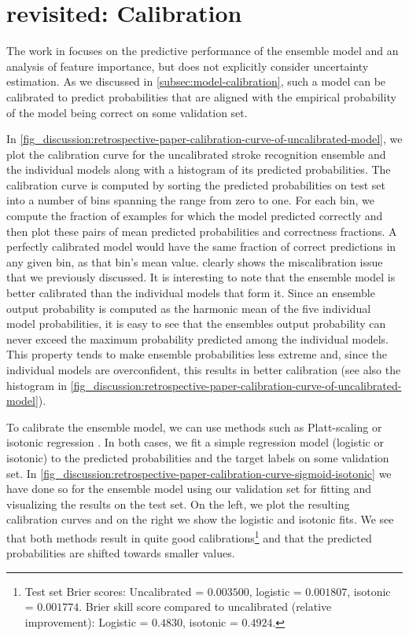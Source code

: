 \section{ revisited: Calibration}
The work in \textcite{wenstrup_retrospective_2023} focuses on the predictive performance of the ensemble model and an analysis of feature importance, but does not explicitly consider uncertainty estimation. 
As we discussed in \cref{subsec:model-calibration}, such a model can be calibrated to predict probabilities that are aligned with the empirical probability of the model being correct on some validation set.

In \cref{fig_discussion:retrospective-paper-calibration-curve-of-uncalibrated-model}, we plot the calibration curve for the uncalibrated stroke recognition ensemble and the individual models along with a histogram of its predicted probabilities. 
The calibration curve is computed by sorting the predicted probabilities on test set into a number of bins spanning the range from zero to one. For each bin, we compute the fraction of examples for which the model predicted correctly and then plot these pairs of mean predicted probabilities and correctness fractions. A perfectly calibrated model would have the same fraction of correct predictions in any given bin, as that bin's mean value.  clearly shows the miscalibration issue that we previously discussed. 
It is interesting to note that the ensemble model is better calibrated than the individual models that form it. Since an ensemble output probability is computed as the harmonic mean of the five individual model probabilities, it is easy to see that the ensembles output probability can never exceed the maximum probability predicted among the individual models. This property tends to make ensemble probabilities less extreme and, since the individual models are overconfident, this results in better calibration (see also the histogram in \cref{fig_discussion:retrospective-paper-calibration-curve-of-uncalibrated-model}). 

To calibrate the ensemble model, we can use methods such as Platt-scaling \parencite{platt_probabilistic_1999} or isotonic regression \parencite{zadrozny_transforming_2002}. 
In both cases, we fit a simple regression model (logistic or isotonic) to the predicted probabilities and the target labels on some validation set. 
In \cref{fig_discussion:retrospective-paper-calibration-curve-sigmoid-isotonic} we have done so for the ensemble model using our validation set for fitting and visualizing the results on the test set. On the left, we plot the resulting calibration curves and on the right we show the logistic and isotonic fits. We see that both methods result in quite good calibrations\footnote{Test set Brier scores: Uncalibrated = $0.003500$, logistic = $0.001807$, isotonic = $0.001774$. Brier skill score compared to uncalibrated (relative improvement): Logistic = $0.4830$, isotonic = $0.4924$.} and that the predicted probabilities are shifted towards smaller values. 


